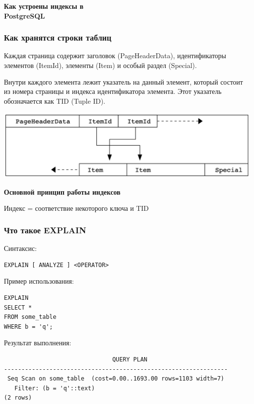 \documentclass[aspectratio=169]{beamer}
\begin{document}
\begin{frame}
  \begin{center}
    {\huge \textbf{Как устроены индексы в \\ PostgreSQL}}
  \end{center}
\end{frame}

\begin{frame}
  \frametitle{Как хранятся строки таблиц}

  Каждая страница содержит заголовок (PageHeaderData), идентификаторы элементов
  (ItemId), элементы (Item) и особый раздел (Special).

  \vspace*{1em}

  Внутри каждого элемента лежит указатель на данный элемент, который состоит из
  номера страницы и индекса идентификатора элемента. Этот указатель обозначается
  как TID (Tuple ID).

  \vspace*{1em}

  \begin{center}
    \includegraphics[width=\textwidth]{images/page.png}
  \end{center}
\end{frame}

\begin{frame}
  \vspace*{1em}
  \begin{center}
    {\LARGE \textbf{Основной принцип работы индексов}}

    \vspace*{1em}

    Индекс = соответствие некоторого ключа и TID

  \end{center}
\end{frame}

\begin{frame}[fragile]
  \frametitle{Что такое EXPLAIN}

  Синтаксис:
  \begin{verbatim}
EXPLAIN [ ANALYZE ] <OPERATOR>
  \end{verbatim}

  Пример использования:
  \begin{verbatim}
EXPLAIN 
SELECT * 
FROM some_table
WHERE b = 'q';
  \end{verbatim}

  Результат выполнения:
  \begin{verbatim}
                               QUERY PLAN
----------------------------------------------------------------
 Seq Scan on some_table  (cost=0.00..1693.00 rows=1103 width=7)
   Filter: (b = 'q'::text)
(2 rows)
  \end{verbatim}
\end{frame}
\end{document}
